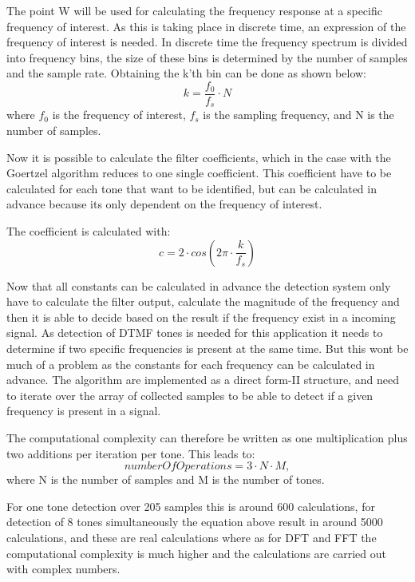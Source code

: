 	The point W will be used for calculating the frequency response at a specific frequency of interest. As this is taking
	place in discrete time, an expression of the frequency of interest is needed. In discrete time the frequency spectrum
	is divided into frequency bins, the size of these bins is determined by the number of samples and the sample rate.
	Obtaining the k'th bin can be done as shown below:
	\begin{equation}k = \frac{f_{0}}{f_{s}}\cdot N\end{equation}
	where $f_{0}$ is the frequency of interest, $f_{s}$ is the sampling frequency, and N is the number of samples.
	
	Now it is possible to calculate the filter coefficients, which in the case with the Goertzel algorithm reduces 
	to one single coefficient. This coefficient have to be calculated for each tone that want to be identified, but can 
	be calculated in advance because its only dependent on the frequency of interest.
	
	The coefficient is calculated with:
	\begin{equation}c = 2\cdot cos(2\pi \cdot \frac{k}{f_{s}})\end{equation}
	
	Now that all constants can be calculated in advance the detection system only have to calculate the filter output, calculate
	the magnitude of the frequency and then it is able to decide based on the result if the frequency exist in a incoming signal.
	As detection of DTMF tones is needed for this application it needs to determine if two specific frequencies is present at the
	same time. But this wont be much of a problem as the constants for each frequency can be calculated in advance.
	The algorithm are implemented as a direct form-II structure, and need to iterate over the array of collected samples to be
	able to detect if a given frequency is present in a signal.
	
	The computational complexity can therefore be written as one multiplication plus two additions per iteration per tone.
	This leads to:
	\begin{equation}numberOfOperations = 3\cdot N\cdot M,\end{equation}
	where N is the number of samples and M is the number of tones.
	
	For one tone detection over 205 samples this is around 600 calculations, for detection of 8 tones simultaneously the equation
	above result in around 5000 calculations, and these are real calculations where as for DFT and FFT the computational complexity 
	is much higher and the calculations are carried out with complex numbers.
	
